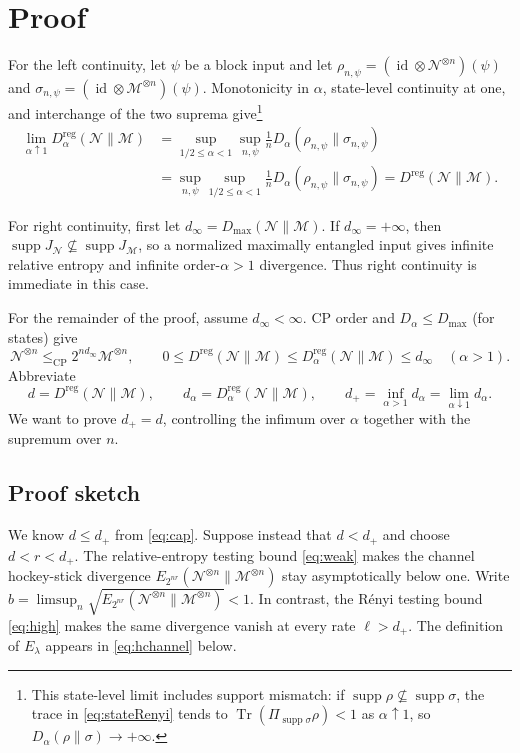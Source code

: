 \documentclass[11pt,letterpaper]{article}
\numberwithin{equation}{section}
\newcommand{\N}{\mathcal N}
\newcommand{\M}{\mathcal M}
\newcommand{\id}{\operatorname{id}}
\newcommand{\Tr}{\operatorname{Tr}}
\newcommand{\supp}{\operatorname{supp}}
\newcommand{\reg}{\mathrm{reg}}
\newcommand{\cp}{\mathrm{CP}}
\newcommand{\Dt}{D}
\begin{document}
\section{Proof}\label{sec:proof}
For the left continuity, let $\psi$ be a block input and let $\rho_{n,\psi}=(\id\otimes\N^{\otimes n})(\psi)$ and $\sigma_{n,\psi}=(\id\otimes\M^{\otimes n})(\psi)$. Monotonicity in $\alpha$, state-level continuity at one, and interchange of the two suprema give\footnote{This state-level limit includes support mismatch: if $\supp\rho\not\subseteq\supp\sigma$, the trace in \eqref{eq:stateRenyi} tends to $\Tr(\Pi_{\supp\sigma}\rho)<1$ as $\alpha\uparrow1$, so $\Dt_\alpha(\rho\|\sigma)\to+\infty$.}
\begin{align*}
 \lim_{\alpha\uparrow1}\Dt_\alpha^{\reg}(\N\|\M)
 &=\sup_{1/2\le\alpha<1}\sup_{n,\psi}
       \frac1n\Dt_\alpha(\rho_{n,\psi}\|\sigma_{n,\psi})\\
 &=\sup_{n,\psi}\sup_{1/2\le\alpha<1}
       \frac1n\Dt_\alpha(\rho_{n,\psi}\|\sigma_{n,\psi})
 =D^{\reg}(\N\|\M).
\end{align*}

For right continuity, first let $d_\infty=D_{\max}(\N\|\M)$. If $d_\infty=+\infty$, then $\supp J_\N\not\subseteq\supp J_\M$, so a normalized maximally entangled input gives infinite relative entropy and infinite order-$\alpha>1$ divergence. Thus right continuity is immediate in this case.

For the remainder of the proof, assume $d_\infty<\infty$. CP order and  $\Dt_\alpha\le D_{\max}$ (for states) give
\begin{equation}\label{eq:cap}
 \N^{\otimes n}\le_{\cp}2^{n d_\infty}\M^{\otimes n},\qquad
 0\le D^{\reg}(\N\|\M)
 \le\Dt_\alpha^{\reg}(\N\|\M)\le d_\infty\quad(\alpha>1).
\end{equation}
Abbreviate
\begin{equation}\label{eq:thresholds}
 d=D^{\reg}(\N\|\M),\qquad
 d_\alpha=\Dt_\alpha^{\reg}(\N\|\M),\qquad
 d_+=\inf_{\alpha>1}d_\alpha=\lim_{\alpha\downarrow1}d_\alpha.
\end{equation}
We want to prove $d_+= d$, controlling the infimum over $\alpha$ together with the supremum over $n$.

\subsection{Proof sketch}\label{sec:sketch}
We know $d\le d_+$ from \eqref{eq:cap}. Suppose instead that $d<d_+$ and choose $d<r<d_+$. The relative-entropy testing bound \eqref{eq:weak} makes the channel hockey-stick divergence $E_{2^{nr}}(\N^{\otimes n}\|\M^{\otimes n})$ stay asymptotically below one. Write $b=\limsup_n\sqrt{E_{2^{nr}}(\N^{\otimes n}\|\M^{\otimes n})}<1$. In contrast, the R\'enyi testing bound \eqref{eq:high} makes the same divergence vanish at every rate $\ell>d_+$. The definition of $E_\lambda$ appears in \eqref{eq:hchannel} below.
\end{document}
